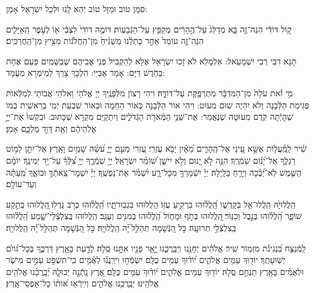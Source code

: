 \documentclass[twoside, openany, parskip=half, 11pt]{book}
\begin{document}
 סִמָּן טוֹב וּמַזָּל טוֹב יְהֵא לָֽנוּ וּלְכָל יִשְׂרָאֵל אָמֵן:

ק֣וֹל דּוֹדִ֔י הִנֵּה־זֶ֖ה בָּ֑א מְדַלֵּג֙ עַל־הֶ֣הָרִ֔ים מְקַפֵּ֖ץ עַל־הַגְּֿבָעֽוֹת׃ דּוֹמֶ֤ה דוֹדִי֙ לִצְבִ֔י א֖וֹ לְעֹ֣פֶר הָֽאַיָּלִ֑ים הִנֵּה־זֶ֤ה עוֹמֵד֙ אַחַ֣ר כָּתְלֵ֔נוּ מַשְׁגִּ֨יחַ֙ מִן־הַֽחֲלֹּנ֔וֹת מֵצִ֖יץ מִן־הַֽחֲרַכִּֽים׃

תָּנָא דִבֵּי רְבִי יִשְׁמָעֵאל: אִלְמָלֵא לֹא זָכוּ יִשְׂרָאֵל אֶלָּא לְהַקְבִּיל פְּנֵי אֲבִיהֶם שֶׁבַּשָּׁמַֽיִם פַּעַם אֶחָת בַּחֹֽדֶשׁ דַּיָּם: אָמַר אַבַּיֵּי: הִלְכָּךְ צָרֵךְ לְמֵימְרָא מְעֻמָּד:

מִ֣י זֹ֗את עֹלָה֙ מִן־הַמִּדְבָּ֔ר מִתְרַפֶּ֖קֶת עַל־דּוֹדָ֑הּ׃ 
 	וִיהִי רָצוֹן מִלְּֿפָנֶֽיךָ יְיָ אֱלֹהַי וֵאלֹהֵי אֲבוֹתַי לְמַלְּֿאוֹת פְּגִימַת הַלְּֿבָנָה וְלֹא יִהְיֶה שׁוּם מִעוּט: וִיהִי אוֹר הַלְּֿבָנָה כְּאוֹר הַחַמָּה וּכְאוֹר שִׁבְעַת יְמֵי בְרֵאשִׁית כְּמוֹ שֶׁהָיְֿתָה קֹֽדֶם מִעוּטָהּ שֶׁנֶּאֱמַר:
אֶת־שְׁנֵ֥י הַמְּֿאֹרֹ֖ת הַגְּֿדֹלִ֑ים וְיִתְקַיַּם מִקְרָא שֶׁכָּתוּב: וּבִקְשׁוּ֙ אֶת־יְיָ֣ אֱלֹֽהֵיהֶ֔ם וְאֵ֖ת דָּוִ֣ד מַלְכָּ֑ם אָמֵן׃


 שִׁ֗יר לַֽמַּֽ֫עֲל֥וֹת אֶשָּׂ֣א עֵ֭ינַי אֶל־הֶֽהָרִ֑ים מֵ֝אַ֗יִן יָבֹ֥א עֶזְרִֽי׃ עֶ֭זְרִי מֵעִ֣ם יְיָ֑ עֹ֝שֵׂ֗ה שָׁמַ֥יִם וָאָֽרֶץ׃ אַל־יִתֵּ֣ן לַמּ֣וֹט רַגְלֶ֑ךָ אַל־יָ֝נ֗וּם שֹֽׁמְֿרֶֽךָ׃ הִנֵּ֤ה לֹ֣א יָ֭נוּם וְלֹ֣א יִישָׁ֑ן שׁ֝וֹמֵ֗ר יִשְׂרָאֵֽל׃ יְיָ֥ שֹֽׁמְֿרֶ֑ךָ יְיָ֥ צִ֝לְּֿךָ֗ עַל־יַ֥ד יְמִינֶֽךָ׃ יוֹמָ֗ם הַשֶּׁ֥מֶשׁ לֹֽא־יַ֝כֶּ֗כָּה וְיָרֵ֥חַ בַּלָּֽיְלָה׃ יְיָ֗ יִשְֿׁמָרְךָ֥ מִכָּל־רָ֑ע יִ֝שְׁמֹ֗ר אֶת־נַפְשֶֽׁךָ׃ יְיָ֗ יִשְׁמָר־צֵֽאתְֿךָ֥ וּבוֹאֶ֑ךָ מֵֽ֝עַתָּ֗ה וְעַד־עוֹלָֽם׃

הַֽלֲלוּיָ֙הּ הַֽלֲלוּ־אֵ֥ל בְּקָדְשׁ֑וֹ הַֽ֝לֲל֗וּהוּ בִּרְקִ֥יעַ עֻזּֽוֹ׃ 
הַֽלֲלוּהוּ בִּגְבֽוּרֹתָ֑יו הַֽ֝לֲל֗וּהוּ כְּרֹ֣ב גֻּדְלֽוֹ׃ 
֖הַֽלֲלוּהוּ בְּתֵ֣קַע שׁוֹפָ֑ר הַֽ֝לֲל֗וּהוּ בְּנֵ֣בֶל וְכִנּֽוֹר׃ 
֖הַֽלֲלוּהוּ בְּתֹ֣ף וּמָח֑וֹל הַֽ֝לֲל֗וּהוּ בְּמִנִּ֥ים וְעֻגָֽב׃ 
הַֽלֲלוּהוּ בְּֽצִלְצְֿלֵי־שָׁ֑מַע הַֽ֝לֲל֗וּהוּ בְּֽצִלְצְֿלֵ֥י תְרוּעָֽה׃ 
 כֹּ֣ל הַ֭נְּֿשָׁמָה תְּהַלֵּ֥ל ֝יָ֗הּ הַֽלֲלוּיָֽהּ׃
 כֹּ֣ל הַ֭נְּֿשָׁמָה תְּהַלֵּ֥ל ֝יָ֗הּ הַֽלֲלוּיָֽהּ׃

\enlargethispage{\baselineskip}
לַֽמְֿנַצֵּ֥ח
   בִּ֝נְגִינֹ֗ת מִזְמ֥וֹר שִֽׁיר׃ אֱלֹהִ֗ים יְחָנֵּ֥נוּ וִֽיבָֽרֲכֵ֑נוּ יָ֤אֵ֥ר פָּנָ֖יו אִתָּ֣נוּ סֶֽלָה׃ לָדַ֣עַת בָּאָ֣רֶץ דַּרְכֶּ֑ךָ בְּכָל־גּ֝וֹיִ֗ם יְשֽׁוּעָתֶֽךָ׃ יוֹד֖וּךָ עַמִּ֥ים אֱלֹהִ֑ים י֝וֹד֗וּךָ עַמִּ֥ים כֻּלָּֽם׃ יִשְׂמְֿח֥וּ וִירַֽנֲנ֗וּ לְאֻ֫מִּ֥ים כִּֽי־תִשְׁפֹּ֣ט עַמִּ֣ים מִישֹׁ֑ר וּלְאֻמִּ֓ים בָּאָ֖רֶץ תַּנְחֵ֣ם סֶֽלָה׃ יוֹד֖וּךָ עַמִּ֥ים אֱלֹהִ֑ים י֝וֹד֗וּךָ עַמִּ֥ים כֻּלָּֽם׃ אֶ֭רֶץ נָֽתְֿנָ֣ה יְבוּלָ֑הּ יְ֝בָֽרֲכֵ֗נוּ אֱלֹהִ֥ים אֱלֹהֵֽינוּ׃ יְבָֽרֲכֵ֥נוּ אֱלֹהִ֑ים וְיִֽירְֿא֥וּ א֝וֹת֗וֹ כָּל־אַפְסֵי־אָֽרֶץ׃ 
\end{document}
